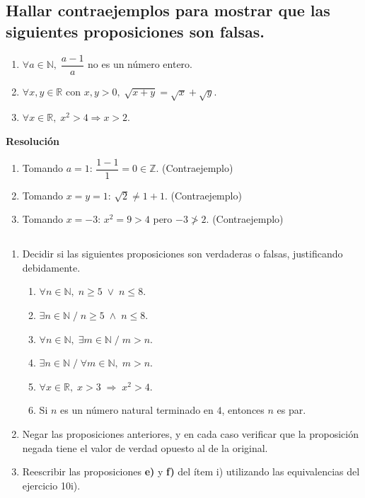 \documentclass[11pt]{article}
\newcommand{\N}{\mathbb{N}}
\newcommand{\Z}{\mathbb{Z}}
\newcommand{\R}{\mathbb{R}}
\begin{document}
\subsection{Hallar contraejemplos para mostrar que las siguientes proposiciones son falsas.}

\begin{enumerate}[label=\roman*)]
    \item \(\forall a \in \N,\; \dfrac{a-1}{a}\) no es un número entero.
    \item \(\forall x, y \in \R\) con \(x,y>0,\; \sqrt{x+y} = \sqrt{x} + \sqrt{y}\).
    \item \(\forall x \in \R,\; x^2 > 4 \Rightarrow x > 2\).
\end{enumerate}

\textbf{Resolución}
\begin{enumerate}[label=\roman*)]
    \item Tomando \(a=1\): \(\dfrac{1-1}{1}=0\in\Z\). (Contraejemplo)
    \item Tomando \(x=y=1\): \(\sqrt{2}\neq 1+1\). (Contraejemplo)
    \item Tomando \(x=-3\): \(x^2=9>4\) pero \(-3\not>2\). (Contraejemplo)
\end{enumerate}

\subsection{}

\begin{enumerate}[label=\roman*)]
    \item Decidir si las siguientes proposiciones son verdaderas o falsas, justificando debidamente.
    \begin{enumerate}[label=(\alph*)]
        \item $\forall n \in \mathbb{N}, \; n \geq 5 \; \lor \; n \leq 8.$
        \item $\exists n \in \mathbb{N} \; / \; n \geq 5 \; \land \; n \leq 8.$
        \item $\forall n \in \mathbb{N}, \; \exists m \in \mathbb{N} \; / \; m > n.$
        \item $\exists n \in \mathbb{N} \; / \; \forall m \in \mathbb{N}, \; m > n.$
        \item $\forall x \in \mathbb{R}, \; x > 3 \; \Rightarrow \; x^2 > 4.$
        \item Si $n$ es un número natural terminado en $4$, entonces $n$ es par.
    \end{enumerate}

    \item Negar las proposiciones anteriores, y en cada caso verificar que la proposición negada tiene el valor de verdad opuesto al de la original.

    \item Reescribir las proposiciones \textbf{e)} y \textbf{f)} del ítem i) utilizando las equivalencias del ejercicio 10i).
\end{enumerate}
\end{document}
